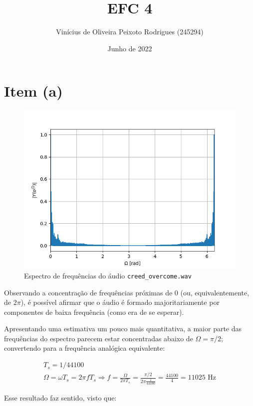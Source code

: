 \documentclass{article}
\title{EFC 4}
\author{Vinícius de Oliveira Peixoto Rodrigues (245294)}
\date{Junho de 2022}
\begin{document}
\maketitle

\section*{Item (a)}

\begin{figure}[!ht]
    \centering
    \includegraphics[width=\linewidth]{images/spectrum.png}
    \caption{Espectro de frequências do áudio \texttt{creed\_overcome.wav}}
\end{figure}

Observando a concentração de frequências próximas de $0$ (ou, equivalentemente, de $2\pi$), é possível afirmar que o áudio é formado majoritariamente por componentes de baixa frequência (como era de se esperar).

Apresentando uma estimativa um pouco mais quantitativa, a maior parte das frequências do espectro parecem estar concentradas abaixo de $\Omega = \pi/2$; convertendo para a frequência analógica equivalente:

\begin{gather*}
    T_s = 1/44100 \\
    \Omega = \omega T_s = 2\pi f T_s \Rightarrow f = \frac{\Omega}{2\pi T_s} =
        \frac{\pi/2}{2\pi \frac{1}{44100}} = \frac{44100}{4} = 11025 \text{ Hz}
\end{gather*}

Esse resultado faz sentido, visto que:
\end{document}
